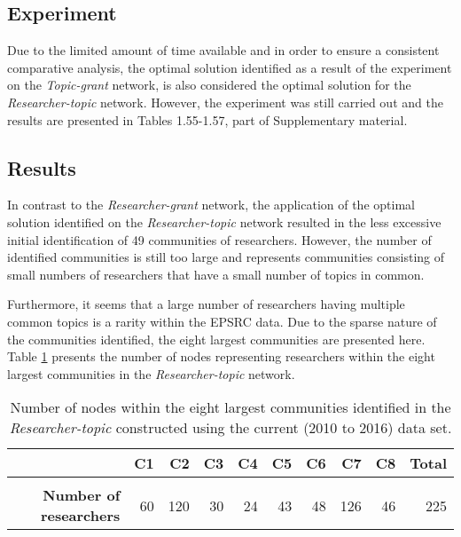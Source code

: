 \subsection{Experiment}

Due to the limited amount of time available and in order to ensure a consistent comparative analysis, the optimal solution identified as a result of the experiment on the \textit{Topic-grant} network, is also considered the optimal solution for the \textit{Researcher-topic} network. However, the experiment was still carried out and the results are presented in Tables 1.55-1.57, part of Supplementary material.

\subsection{Results}

In contrast to the \textit{Researcher-grant} network, the application of the optimal solution identified on the \textit{Researcher-topic} network resulted in the less excessive initial identification of 49 communities of researchers. However, the number of identified communities is still too large and represents communities consisting of small numbers of researchers that have a small number of topics in common.

Furthermore, it seems that a large number of researchers having multiple common topics is a rarity within the EPSRC data. Due to the sparse nature of the communities identified, the eight largest communities are presented here. Table \ref{table:researcher_a_current_numbers} presents the number of nodes representing researchers within the eight largest communities in the \textit{Researcher-topic} network.

\begin{table}[!htbp]
\centering
\caption[Number of nodes within the eight largest communities in the \textit{Researcher-topic} network constructed using the current data set (2010 to 2016)]{Number of nodes within the eight largest communities identified in the \textit{Researcher-topic} constructed using the current (2010 to 2016) data set.}
\label{table:researcher_a_current_numbers}
\begin{tabular}{r|rrrrrrrrr}
{} & \textbf{C1} & \textbf{C2} & \textbf{C3} & \textbf{C4} & \textbf{C5} & \textbf{C6} & \textbf{C7} & \textbf{C8} & \textbf{Total}\\
\hline\\
\textbf{Number of researchers} & {60} & {120} & {30} & {24} & {43} & {48} & {126} & {46} & {225}
\end{tabular}
\end{table}

